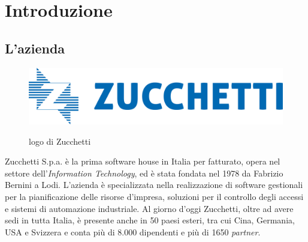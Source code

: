 \chapter{Introduzione}
\label{chap:introduzione}








\section{L'azienda}
\begin{figure}[h!]
    \centering
    \includegraphics[alt={Testo alternativo dell'immagine}, width=0.7\columnwidth]{img/logoZucchetti.jpeg}
    \caption{logo di Zucchetti}
    \label{fig:entanglement}
\end{figure}
Zucchetti S.p.a. è la prima software house in Italia per fatturato, opera nel settore dell'\textit{Information Technology}, ed è stata fondata nel 1978 da Fabrizio Bernini a Lodi. 
L'azienda è specializzata nella realizzazione di software gestionali per la pianificazione delle risorse d'impresa, soluzioni per il controllo degli accessi e sistemi di automazione industriale. Al giorno d'oggi Zucchetti, oltre ad avere sedi in tutta Italia, è presente anche in 50 paesi esteri, tra cui Cina, Germania, USA e Svizzera e conta più di 8.000 dipendenti e più di 1650 \textit{partner}.

